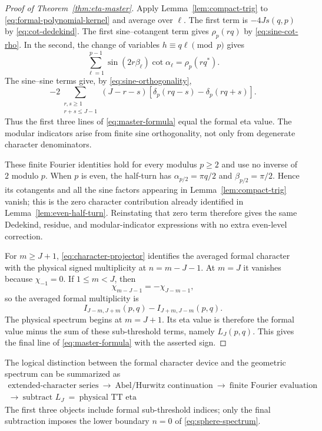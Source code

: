 \documentclass[11pt]{article}
\theoremstyle{definition}
\begin{document}
\begin{proof}[Proof of Theorem~\ref{thm:eta-master}]
Apply Lemma~\ref{lem:compact-trig} to
\eqref{eq:formal-polynomial-kernel} and average over $\ell$.  The first term
is $-4J s(q,p)$ by \eqref{eq:cot-dedekind}.  The first sine--cotangent term
gives $\rho_p(rq)$ by \eqref{eq:sine-cot-rho}.  In the second, the change of
variables $h\equiv q\ell\pmod p$ gives
\[
 \sum_{\ell=1}^{p-1}\sin(2r\beta_\ell)\cot\alpha_\ell
 =\rho_p(rq^*).
\]
The sine--sine terms give, by \eqref{eq:sine-orthogonality},
\[
 -2\!\!\sum_{\substack{r,s\geq1\\r+s\leq J-1}}
 (J-r-s)
 \left[\delta_p(rq-s)-\delta_p(rq+s)\right].
\]
Thus the first three lines of \eqref{eq:master-formula} equal the formal eta
value.  The modular indicators arise from finite sine orthogonality, not
only from degenerate character denominators.

These finite Fourier identities hold for every modulus $p\geq2$ and use no
inverse of $2$ modulo $p$.  When $p$ is even, the half-turn has
$\alpha_{p/2}=\pi q/2$ and $\beta_{p/2}=\pi/2$.  Hence its cotangents and all
the sine factors appearing in Lemma~\ref{lem:compact-trig} vanish; this is
the zero character contribution already identified in
Lemma~\ref{lem:even-half-turn}.  Reinstating that zero term therefore gives
the same Dedekind, residue, and modular-indicator expressions with no extra
even-level correction.

For $m\geq J+1$, \eqref{eq:character-projector} identifies the averaged
formal character with the physical signed multiplicity at $n=m-J-1$.  At
$m=J$ it vanishes because $\chi_{-1}=0$.  If $1\leq m<J$, then
\[
 \chi_{m-J-1}=-\chi_{J-m-1},
\]
so the averaged formal multiplicity is
\[
 I_{J-m,J+m}(p,q)-I_{J+m,J-m}(p,q).
\]
The physical spectrum begins at $m=J+1$.  Its eta value is therefore the
formal value minus the sum of these sub-threshold terms, namely
$L_J(p,q)$.  This gives the final line of
\eqref{eq:master-formula} with the asserted sign.
\end{proof}

The logical distinction between the formal character device and the
geometric spectrum can be summarized as
\begin{equation}
\boxed{
\begin{gathered}
\text{extended-character series}
\ \longrightarrow\
\text{Abel/Hurwitz continuation}
\ \longrightarrow\
\text{finite Fourier evaluation}\\
\longrightarrow\
\text{subtract }L_J
\ =\
\text{physical TT eta}
\end{gathered}}
\label{eq:formal-to-physical}
\end{equation}
The first three objects include formal sub-threshold indices; only the final
subtraction imposes the lower boundary $n=0$ of
\eqref{eq:sphere-spectrum}.
\end{document}
